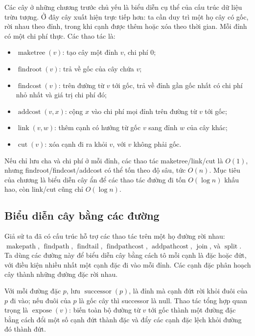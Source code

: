 \documentclass[11pt]{article}
\begin{document}
Các cây ở những chương trước chủ yếu là biểu diễn cụ thể của cấu trúc dữ liệu
trừu tượng. Ở đây cây xuất hiện trực tiếp hơn: ta cần duy trì một họ cây có gốc,
rời nhau theo đỉnh, trong khi cạnh được thêm hoặc xóa theo thời gian. Mỗi đỉnh
có một chi phí thực. Các thao tác là:
\begin{itemize}
  \item \(\operatorname{maketree}(v)\): tạo cây một đỉnh \(v\), chi phí \(0\);
  \item \(\operatorname{findroot}(v)\): trả về gốc của cây chứa \(v\);
  \item \(\operatorname{findcost}(v)\): trên đường từ \(v\) tới gốc, trả về đỉnh
        gần gốc nhất có chi phí nhỏ nhất và giá trị chi phí đó;
  \item \(\operatorname{addcost}(v,x)\): cộng \(x\) vào chi phí mọi đỉnh trên
        đường từ \(v\) tới gốc;
  \item \(\operatorname{link}(v,w)\): thêm cạnh có hướng từ gốc \(v\) sang đỉnh
        \(w\) của cây khác;
  \item \(\operatorname{cut}(v)\): xóa cạnh đi ra khỏi \(v\), với \(v\) không
        phải gốc.
\end{itemize}

Nếu chỉ lưu cha và chi phí ở mỗi đỉnh, các thao tác maketree/link/cut là
\(O(1)\), nhưng findroot/findcost/addcost có thể tốn theo độ sâu, tức \(O(n)\).
Mục tiêu của chương là biểu diễn cây ẩn để các thao tác đường đi tốn
\(O(\log n)\) khấu hao, còn link/cut cũng chỉ \(O(\log n)\).

\subsection*{Biểu diễn cây bằng các đường}

Giả sử ta đã có cấu trúc hỗ trợ các thao tác trên một họ đường rời nhau:
\(\operatorname{makepath}\), \(\operatorname{findpath}\),
\(\operatorname{findtail}\), \(\operatorname{findpathcost}\),
\(\operatorname{addpathcost}\), \(\operatorname{join}\), và
\(\operatorname{split}\). Ta dùng các đường này để biểu diễn cây bằng cách tô
mỗi cạnh là đặc hoặc đứt, với điều kiện nhiều nhất một cạnh đặc đi vào mỗi
đỉnh. Các cạnh đặc phân hoạch cây thành những đường đặc rời nhau.

Với mỗi đường đặc \(p\), lưu \(\operatorname{successor}(p)\), là đỉnh mà cạnh
đứt rời khỏi đuôi của \(p\) đi vào; nếu đuôi của \(p\) là gốc cây thì successor
là null. Thao tác tổng hợp quan trọng là \(\operatorname{expose}(v)\): biến toàn
bộ đường từ \(v\) tới gốc thành một đường đặc bằng cách đổi một số cạnh đứt
thành đặc và đẩy các cạnh đặc lệch khỏi đường đó thành đứt.
\end{document}
